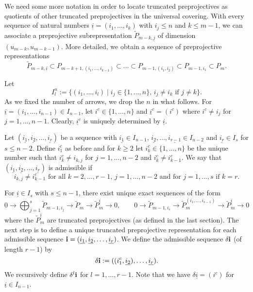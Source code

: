\documentclass{amsart}
\newcommand{\ui}{\underline i}
\newcommand{\uj}{\underline j}
\newcommand{\ses}[3]{0\rightarrow #1\rightarrow #2\rightarrow#3\rightarrow 0}
\begin{document}
We need some more notation in order to locate truncated preprojectives as quotients of other truncated preprojectives in the universal covering.
With every sequence of natural numbers $\ui=(i_1,\ldots,i_k)$ with $i_j\leq n$ and $k\leq m-1$, we can associate a preprojective subrepresentation $\tilde P_{m-k,\uj}$ of dimension $(u_{m-k},u_{m-k-1})$. More detailed, we obtain a sequence of preprojective representations 
$$\tilde P_{m-k,\ui}\subset P_{m-k+1,(i_1,\ldots,i_{k-1})}\subset\ldots\subset P_{m-1,(i_1,i_2)}\subset P_{m-1,i_1}\subset P_{m}.$$
  
Let
$$I^n_l:=\{(i_1,\ldots,i_{l})\mid i_j\in\{1,\ldots,n\},\,i_j\neq i_k\text{ if }j\neq k\}.$$
As we fixed the number of arrows, we drop the $n$ in what follows. For $\ui=(i_1,\ldots,i_{n-1})\in I_{n-1}$, let $i^c\in \{1,\ldots,n\}$ and $\ui^c=(i^c)$ where $i^c\neq i_j$ for $j=1,\ldots,n-1$. Clearly, $\ui^c$ is uniquely determined by $\ui$.



Let $(\underline{i_1},\underline{i_2},\ldots,\underline{i_r})$ be a sequence with $\underline{i_1}\in I_{n-1}$, $\underline{i_2},\ldots,\underline{i_{r-1}}\in I_{n-2}$ and $\underline{i_r}\in I_s$ for $s\leq n-2$. Define $i_1^c$ as before and for $k\geq 2$ let $i_k^c\in\{1,\ldots,n\}$ be the unique number such that $i_k^c\neq i_{k,j}$ for $j=1,\ldots,n-2$ and $i_k^c\neq i_{k-1}^c$. We say that $(\underline{i_1},\underline{i_2},\ldots,\underline{i_r})$ is admissible if 
$$ i_{k,j}\neq i_{k-1}^{c}\text{ for all }k=2,\ldots, r-1,\,j=1,\ldots,n-2\text{ and for }j=1,\ldots,s\text{ if }k=r.$$ 



For $\ui\in I_{s}$ with $s\leq n-1$, there exist unique exact sequences of the form
\[\ses{\bigoplus_{j=1}^s\tilde P_{m-1,i_j}}{\tilde P_m}{\tilde P_{m}^{\ui}},\quad\quad\ses{\tilde P_{m-1,i_s}}{\tilde P_{m}^{(i_1,\ldots,i_{s-1})}}{\tilde P_{m}^{\ui}}\]
where the $\tilde P_m^{\ui}$ are truncated preprojectives (as defined in the last section). The next step is to define a unique truncated preprojective representation for each admissible sequence ${\bf i}=(\underline{i_1},\underline{i_2},\ldots,\underline{i_r})$. We define the admissible sequence $\delta {\bf i}$ (of length $r-1$) by
\[\delta {\bf i}:=((i_1^c,\underline{i_2}),\ldots,\underline{i_r}).\]
We recursively define $\delta^l{\bf i}$ for $l=1,\dots,r-1$.
Note that we have $\delta\ui=(i^c)$ for $\ui\in I_{n-1}$.
\end{document}
